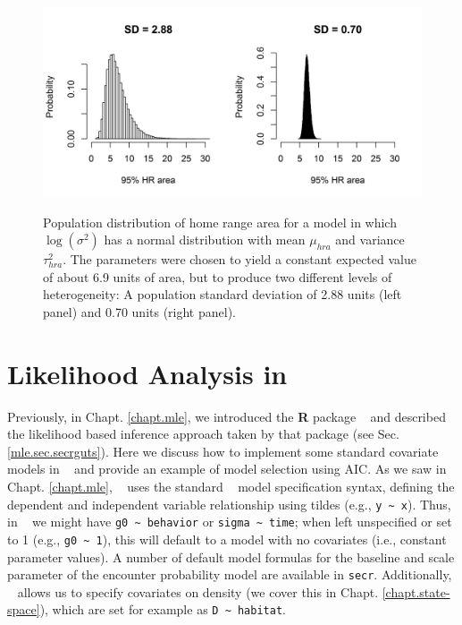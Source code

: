 \begin{figure}[ht]
\begin{center}
\includegraphics[height=2.5in,width=5in]{Ch7-Covariates/figs/area_heterogeneity.png}
\end{center}
\caption{
Population distribution of home range area for a model in which
$\log(\sigma^{2})$ has a normal distribution with mean $\mu_{hra}$ and
variance $\tau^{2}_{hra}$. The parameters were chosen to yield a
constant expected value of about 6.9 units of area, but to produce two
different levels of heterogeneity: A population standard deviation of
2.88 units (left panel) and 0.70 units (right panel). 
}
\label{covariates.fig.one}
\end{figure}



\section{Likelihood Analysis in \secr}
\label{likelihood.secr}

Previously, in Chapt. \ref{chapt.mle}, we introduced the {\bf R}
package \secr~ and described the likelihood based inference approach
taken by that package (see Sec. \ref{mle.sec.secrguts}).  Here we
discuss how to implement some standard covariate models in \secr~ and
provide an example of model selection using AIC.  As we saw in
Chapt. \ref{chapt.mle}, \secr~ uses the standard \R~ model
specification syntax, defining the dependent and independent variable
relationship using tildes (e.g., \verb+y ~ x+).  Thus, in \secr~ we
might have \verb+g0 ~ behavior+ or \verb+sigma ~ time+; when left
unspecified or set to 1 (e.g., \verb+g0 ~ 1+), this will default to a
model with no covariates (i.e., constant parameter values).  A number
of default model formulas for the baseline and scale parameter of the
encounter probability model are available in \mbox{\tt secr}.
Additionally, \secr~ allows us to specify covariates on density (we
cover this in Chapt. \ref{chapt.state-space}), which are set for
example as \verb+D ~ habitat+.

